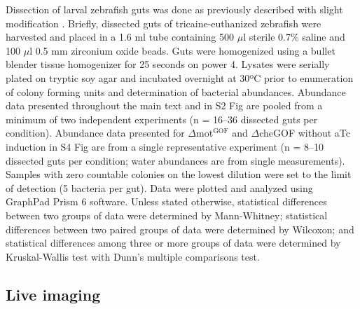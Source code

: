 Dissection of larval zebrafish guts was done as previously described with slight modification \cite{milligan-myhre_study_2011}. Briefly, dissected guts of tricaine-euthanized zebrafish were harvested and placed in a 1.6 ml tube containing 500 $\mu$l sterile 0.7\% saline and 100 $\mu$l 0.5 mm zirconium oxide beads. Guts were homogenized using a bullet blender tissue homogenizer for 25 seconds on power 4. Lysates were serially plated on tryptic soy agar and incubated overnight at 30ºC prior to enumeration of colony forming units and determination of bacterial abundances. Abundance data presented throughout the main text and in S2 Fig are pooled from a minimum of two independent experiments (n = 16–36 dissected guts per condition). Abundance data presented for $\Delta$mot$^{\text{GOF}}$ and $\Delta$cheGOF without aTc induction in S4 Fig are from a single representative experiment (n = 8–10 dissected guts per condition; water abundances are from single measurements). Samples with zero countable colonies on the lowest dilution were set to the limit of detection (5 bacteria per gut). Data were plotted and analyzed using GraphPad Prism 6 software. Unless stated otherwise, statistical differences between two groups of data were determined by Mann-Whitney; statistical differences between two paired groups of data were determined by Wilcoxon; and statistical differences among three or more groups of data were determined by Kruskal-Wallis test with Dunn's multiple comparisons test.  

\subsection{Live imaging}

